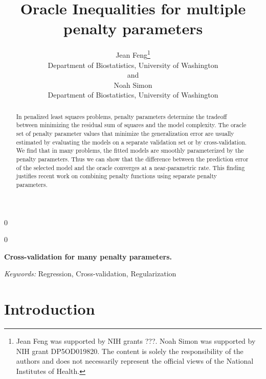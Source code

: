 \documentclass[12pt]{article}
\newcommand{\blind}{0}
\begin{document}
\def\spacingset#1{\renewcommand{\baselinestretch}%
{#1}\small\normalsize} \spacingset{1}



\blind
{
  \title{\bf Oracle Inequalities for multiple penalty parameters}
  \author{Jean Feng\thanks{
    Jean Feng was supported by NIH grants ???. %
    Noah Simon was supported by NIH grant DP5OD019820.
    The content is solely the responsibility of the authors and does not necessarily represent the official views of the National Institutes of Health.}\\
    Department of Biostatistics, University of Washington\\
    and \\
    Noah Simon \\
    Department of Biostatistics, University of Washington}
  \maketitle
} \fi

\blind
{
  \bigskip
  \bigskip
  \bigskip
  \begin{center}
    {\LARGE\bf Cross-validation for many penalty parameters.}
\end{center}
  \medskip
} \fi

\bigskip
\begin{abstract}

In penalized least squares problems, penalty parameters determine the tradeoff between minimizing the residual sum of squares and the model complexity. The oracle set of penalty parameter values that minimize the generalization error are usually estimated by evaluating the models on a separate validation set or by cross-validation. We find that in many problems, the fitted models are smoothly parameterized by the penalty parameters. Thus we can show that the difference between the prediction error of the selected model and the oracle converges at a near-parametric rate. This finding justifies recent work on combining penalty functions using separate penalty parameters.

\end{abstract}

\noindent%
{\it Keywords:}  Regression, Cross-validation, Regularization
\vfill

\newpage
\spacingset{1.45} %
\section{Introduction}
\end{document}

